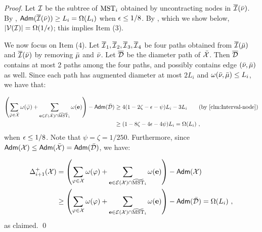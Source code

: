 \begin{proof}
	
	Let $\mathcal{I}$ be the subtree of $\mathrm{MST}_i$ obtained by uncontracting nodes in $\overline{\mathcal{I}}(\bar\nu)$.  By , $\mathsf{Adm}(\overline{\mathcal{I}}(\bar\nu)) \geq L_i = \Omega(L_i)$ when $\epsilon \leq 1/8$.  By , which we show below,  $|\mathcal{V}(\mathcal{I})| =  \Omega(1/\epsilon)$; this implies Item (3).
	
	We now focus on Item (4). Let $\overline{\mathcal{I}}_1, \overline{\mathcal{I}}_2, \overline{\mathcal{I}}_3, \overline{\mathcal{I}}_4$ be four paths obtained from $\overline{\mathcal{I}}(\bar\mu)$ and $\overline{\mathcal{I}}(\bar\nu)$ by removing $\bar\mu$ and $\bar\nu$. Let $\overline{\mathcal{D}}$ be the diameter path of $\bar{\mathcal{X}}$. Then $\overline{\mathcal{D}}$ contains at most 2 paths among the four paths, and possibly contains edge $(\bar\nu,\bar\mu)$ as well. Since each path has augmented diameter at most $2L_i$ and $\omega(\bar\nu,\bar\mu) \leq L_i$, we have that:
	
	\begin{equation*}
		\begin{split}
			 \left(\sum_{\bar{\varphi} \in \bar{\mx}}\omega(\bar{\varphi}) + \sum_{ \mbe\in \me(\bar{\mx})\cap \msttilde_{i}} \omega(\mbe)\right) - \adm(\bar{\md}) &\geq  4(1-2\zeta - \epsilon -\psi)L_i - 3L_i \qquad \mbox{(by \Cref{clm:Interval-node})}\\
			 &\geq (1-8\zeta -4\eps - 4\psi)L_i  = \Omega(L_i)~,
		\end{split}
	\end{equation*}
when $\epsilon \leq 1/8$. Note that $\psi = \zeta = 1/250$. Furthermore, since $\mathsf{Adm}(\mathcal{X}) \leq \mathsf{Adm}(\bar{\mathcal{X}}) = \mathsf{Adm}(\bar{\mathcal{D}})$, we have:

	\begin{equation*}
	\begin{split}
		\Delta^+_{i+1}(\mathcal{X}) &=  \left(\sum_{\varphi \in \mathcal{X}}\omega(\varphi) + \sum_{ \mathbf{e}\in \mathcal{E}(\mathcal{X})\cap \widetilde{\mathrm{MST}}_{i}} \omega(\mathbf{e})\right) - \mathsf{Adm}(\mathcal{X}) \\ &\geq  \left(\sum_{\varphi \in \mathcal{X}}\omega(\varphi) + \sum_{ \mathbf{e}\in \mathcal{E}(\mathcal{X})\cap \widetilde{\mathrm{MST}}_{i}} \omega(\mathbf{e})\right)  - \mathsf{Adm}(\bar{\mathcal{D}}) =  \Omega(L_i)~,
	\end{split}
\end{equation*}
as claimed. \qed		
\end{proof}


